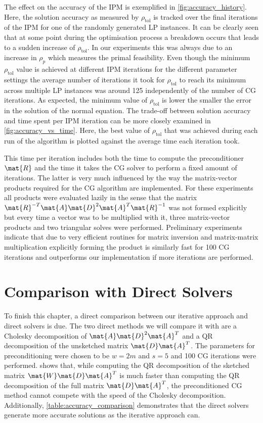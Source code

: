 The effect on the accuracy of the IPM is exemplified in \cref{fig:accuracy_history}.
Here, the solution accuracy as measured by \(\rho_{\mathrm{tol}}\) is tracked over the final iterations of the IPM for one of the randomly generated LP instances.
It can be clearly seen that at some point during the optimisation process a breakdown occurs that leads to a sudden increase of \(\rho_{\mathrm{tol}}\).
In our experiments this was always due to an increase in \(\rho_p\) which measures the primal feasibility.
Even though the minimum \(\rho_{\mathrm{tol}}\) value is achieved at different IPM iterations for the different parameter settings the average number of iterations it took for \(\rho_{\mathrm{tol}}\) to reach its minimum across multiple LP instances was around 125 independently of the number of CG iterations.
As expected, the minimum value of \(\rho_{\mathrm{tol}}\) is lower the smaller the error in the solution of the normal equation.
The trade-off between solution accuracy and time spent per IPM iteration can be more closely examined in \cref{fig:accuracy_vs_time}.
Here, the best value of \(\rho_{\mathrm{tol}}\) that was achieved during each run of the algorithm is plotted against the average time each iteration took.

This time per iteration includes both the time to compute the preconditioner \(\mat{R}\) and the time it takes the CG solver to perform a fixed amount of iterations.
The latter is very much influenced by the way the matrix-vector products required for the CG algorithm are implemented.
For these experiments all products were evaluated lazily in the sense that the matrix \(\mat{R}^{-T}\mat{A}\mat{D}^2\mat{A}^T\mat{R}^{-1}\) was not formed explicitly but every time a vector was to be multiplied with it, three matrix-vector products and two triangular solves were performed.
Preliminary experiments indicate that due to very efficient routines for matrix inversion and matrix-matrix multiplication explicitly forming the product is similarly fast for 100 CG iterations and outperforms our implementation if more iterations are performed.

\section{Comparison with Direct Solvers}\label{sec:experiment-direct-comparison}

To finish this chapter, a direct comparison between our iterative approach and direct solvers is due.
The two direct methods we will compare it with are a Cholesky decomposition of \(\mat{A}\mat{D}^2\mat{A}^T\) and a QR decomposition of the unsketched matrix \(\mat{D}\mat{A}^T\).
The parameters for preconditioning were chosen to be \(w=2m\) and \(s=5\) and 100 CG iterations were performed.
 shows that, while computing the QR decomposition of the sketched matrix \(\mat{W}\mat{D}\mat{A}^T\) is much faster than computing the QR decomposition of the full matrix \(\mat{D}\mat{A}^T\), the preconditioned CG method cannot compete with the speed of the Cholesky decomposition.
Additionally, \cref{table:accuracy_comparison} demonstrates that the direct solvers generate more accurate solutions as the iterative approach can.

